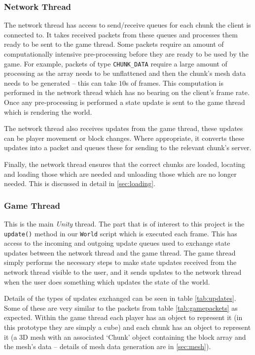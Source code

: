 \documentclass[10pt,twoside,notitlepage,a4paper]{report}
\newcommand{\unity}{\emph{Unity}}
\begin{document}
	\subsubsection{Network Thread}
	The network thread has access to send/receive queues for each chunk the client is connected to. It takes received packets from these queues and processes them ready to be sent to the game thread. Some packets require an amount of computationally intensive pre-processing before they are ready to be used by the game. For example, packets of type \texttt{CHUNK\_DATA} require a large amount of processing as the array needs to be unflattened and then the chunk's mesh data needs to be generated -- this can take $10$s of frames. This computation is performed in the network thread which has no bearing on the client's frame rate. Once any pre-processing is performed a state update is sent to the game thread which is rendering the world.
	
	The network thread also receives updates from the game thread, these updates can be player movement or block changes. Where appropriate, it converts these updates into a packet and queues these for sending to the relevant chunk's server.
	
	Finally, the network thread ensures that the correct chunks are loaded, locating and loading those which are needed and unloading those which are no longer needed. This is discussed in detail in \cref{sec:loading}.
	
	\subsubsection{Game Thread}
	This is the main \unity{} thread. The part that is of interest to this project is the \texttt{update()} method in our \texttt{World} script which is executed each frame. This has access to the incoming and outgoing update queues used to exchange state updates between the network thread and the game thread. The game thread simply performs the necessary steps to make state updates received from the network thread visible to the user, and it sends updates to the network thread when the user does something which updates the state of the world.
	
	Details of the types of updates exchanged can be seen in table \ref{tab:updates}. Some of these are very similar to the packets from table \ref{tab:gamepackets} as expected. Within the game thread each player has an object to represent it (in this prototype they are simply a cube) and each chunk has an object to represent it (a 3D mesh with an associated `Chunk' object containing the block array and the mesh's data -- details of mesh data generation are in \cref{sec:mesh}).
	
\end{document}
